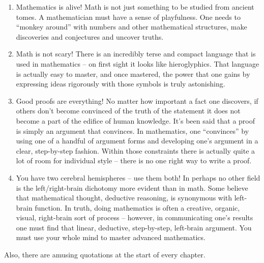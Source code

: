\begin{enumerate}
\item Mathematics is alive!  Math is not just something to be studied from
ancient tomes.  A mathematician must have a sense of playfulness.  One
needs to ``monkey around'' with numbers and other mathematical
structures, make discoveries and conjectures and uncover truths.
\item Math is not scary!  There is an incredibly terse and compact
language that is used in mathematics -- on first sight it looks
like hieroglyphics.  That language is actually easy to master, and once
mastered, the power that one gains by expressing ideas rigorously with
those symbols is truly astonishing.
\item Good proofs are everything!  No matter how important a fact one
discovers, if others don't become convinced of the truth of the
statement it does not become a part of the edifice of human knowledge.
It's been said that a proof is simply an argument that convinces.  In
mathematics, one ``convinces'' by using one of a handful of argument
forms and developing one's argument in a clear, step-by-step fashion.
Within those constraints there is actually quite a lot of room for 
individual style -- there is no one right way to write a proof. 
\item You have two cerebral hemispheres -- use them both!  In perhaps
no other field is the left/right-brain dichotomy more evident than in
math.  Some believe that mathematical thought, deductive reasoning, is
synonymous with left-brain function.  In truth, doing mathematics is
often a creative, organic, visual, right-brain sort of process --
however, in communicating one's results one must find that linear,
deductive, step-by-step, left-brain argument.  You must use your whole
mind to master advanced mathematics.
\end{enumerate}

Also, there are amusing quotations at the start of every chapter.

 
